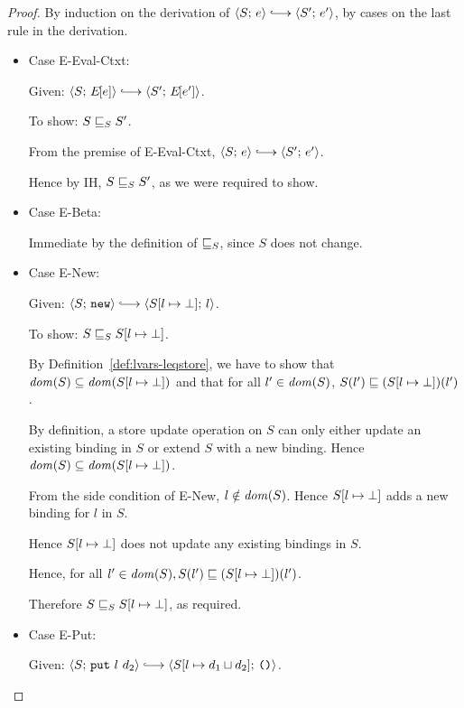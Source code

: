 \begin{proof}
  By induction on the derivation of $\config{S}{e} \parstepsto
  \config{S'}{e'}$, by cases on the last rule in the derivation.

  \begin{itemize}

    \item Case {\sc E-Eval-Ctxt}:

      Given: $\config{S}{\E{e}} \parstepsto \config{S'}{\E{e'}}$.

      To show: $S \sqsubseteq_S S'$.

      From the premise of {\sc E-Eval-Ctxt}, $\config{S}{e}
      \parstepsto \config{S'}{e'}$.

      Hence by IH, $S \sqsubseteq_S S'$, as we were required to show.

    \item Case {\sc E-Beta}:

      Immediate by the definition of $ \sqsubseteq_S $, since $S$ does
      not change.

    \item Case {\sc E-New}:

      Given: $\config{S}{\NEW} \parstepsto
      \config{\extSRaw{S}{l}{\bot}}{l}$.

      To show: $S \sqsubseteq_S S[l \mapsto \bot]$.

      By Definition~\ref{def:lvars-leqstore}, we have to show that
      $\mathit{dom}(S) \subseteq \mathit{dom}(S[l \mapsto \bot])$ and
      that for all $l' \in \mathit{dom}(S)$, $S(l') \sqsubseteq
      (S[l \mapsto \bot])(l')$.

      By definition, a store update operation on $S$ can only either
      update an existing binding in $S$ or extend $S$ with a new
      binding.  Hence $\mathit{dom}(S) \subseteq \mathit{dom}(S[l \mapsto \bot])$.

      From the side condition of {\sc E-New}, $l \notin \mathit{dom}(S)$.
      Hence $S[l \mapsto \bot]$ adds a new binding for $l$ in $S$.

      Hence $S[l \mapsto \bot]$ does not update any existing
      bindings in $S$.

      Hence, for all $l' \in \mathit{dom}(S), S(l') \sqsubseteq
      (S[l \mapsto \bot])(l')$.

      Therefore $S \sqsubseteq_S S[l \mapsto \bot]$, as
      required.

    \item Case {\sc E-Put}:

      Given: $\config{S}{\putexp{l}{d_2}} \parstepsto
      \config{\extSRaw{S}{l}{\userlub{d_1}{d_2}}}{\unit}$.


\end{itemize}
\end{proof}
